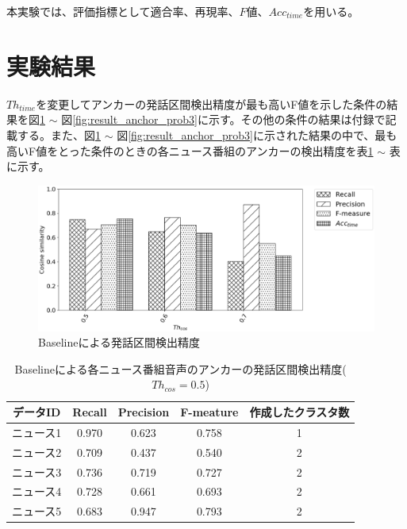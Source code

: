 本実験では、評価指標として適合率、再現率、$F$値、$Acc_{time}$を用いる。

\section{実験結果}
$Th_{time}$を変更してアンカーの発話区間検出精度が最も高いF値を示した条件の結果を図\ref{fig:result_anchor_baseline} $\sim$ 図\ref{fig:result_anchor_prob3}に示す。その他の条件の結果は付録で記載する。また、図\ref{fig:result_anchor_baseline} $\sim$ 図\ref{fig:result_anchor_prob3}に示された結果の中で、最も高いF値をとった条件のときの各ニュース番組のアンカーの検出精度を表\ref{table:baseline_eachnews} $\sim$ 表\label{table:prob3_eachnews}に示す。

\begin{figure}[H]
  \begin{center}
    \includegraphics[scale=0.5]{./figure/baseline.eps}
  \end{center}
  \caption{Baselineによる発話区間検出精度 \label{fig:result_anchor_baseline}}
\end{figure}

\begin{table}[H]
  \begin{center}
    \caption{Baselineによる各ニュース番組音声のアンカーの発話区間検出精度($Th_{cos}=0.5$) \label{table:baseline_eachnews}}
    \begin{tabular}{|c||c|c|c|c|} \hline
データID & Recall & Precision & F-meature & 作成したクラスタ数\\ \hline
ニュース1 & 0.970 & 0.623 & 0.758 & 1 \\ \hline
ニュース2 & 0.709 & 0.437 & 0.540 & 2 \\ \hline
ニュース3 & 0.736 & 0.719 & 0.727 & 2 \\ \hline
ニュース4 & 0.728 & 0.661 & 0.693 & 2 \\ \hline
ニュース5 & 0.683 & 0.947 & 0.793 & 2 \\ \hline
    \end{tabular}
  \end{center}
\end{table}


